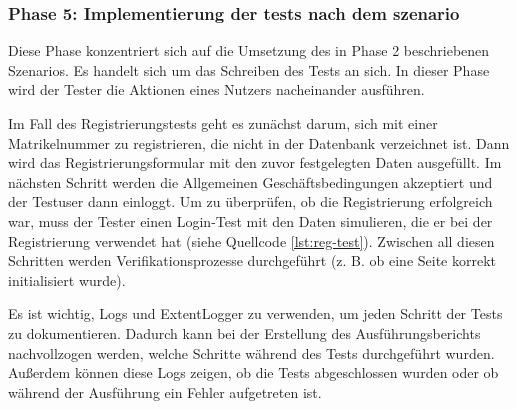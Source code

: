\subsubsection{Phase 5: Implementierung der tests nach dem szenario}

Diese Phase konzentriert sich auf die Umsetzung des in Phase 2
beschriebenen Szenarios. Es handelt sich um das Schreiben des Tests
an sich. In dieser Phase wird der Tester die Aktionen eines Nutzers
nacheinander ausführen.

Im Fall des Registrierungstests geht es zunächst darum, sich mit einer
Matrikelnummer zu registrieren, die nicht in der Datenbank verzeichnet
ist. Dann wird das Registrierungsformular mit den zuvor festgelegten
Daten ausgefüllt. Im nächsten Schritt werden die Allgemeinen
Geschäftsbedingungen akzeptiert und der Testuser dann einloggt.
Um zu überprüfen, ob die Registrierung erfolgreich war, muss der
Tester einen Login-Test mit den Daten simulieren, die er bei der
Registrierung verwendet hat (siehe Quellcode \ref{lst:reg-test}). Zwischen all
diesen Schritten werden Verifikationsprozesse durchgeführt
(z. B. ob eine Seite korrekt initialisiert wurde).

Es ist wichtig, Logs und ExtentLogger zu verwenden, um jeden Schritt
der Tests zu dokumentieren. Dadurch kann bei der Erstellung des
Ausführungsberichts nachvollzogen werden, welche Schritte während
des Tests durchgeführt wurden. Außerdem können diese Logs zeigen,
ob die Tests abgeschlossen wurden oder ob während der Ausführung
ein Fehler aufgetreten ist.


